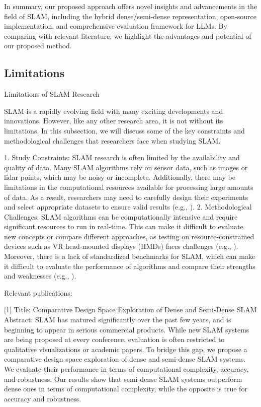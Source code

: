 \documentclass[conference]{IEEEtran}
\begin{document}
In summary, our proposed approach offers novel insights and advancements in the field of SLAM, including the hybrid dense/semi-dense representation, open-source implementation, and comprehensive evaluation framework for LLMs. By comparing with relevant literature, we highlight the advantages and potential of our proposed method.

\subsection{Limitations}
Limitations of SLAM Research

SLAM is a rapidly evolving field with many exciting developments and innovations. However, like any other research area, it is not without its limitations. In this subsection, we will discuss some of the key constraints and methodological challenges that researchers face when studying SLAM.

1. Study Constraints:
SLAM research is often limited by the availability and quality of data. Many SLAM algorithms rely on sensor data, such as images or lidar points, which may be noisy or incomplete. Additionally, there may be limitations in the computational resources available for processing large amounts of data. As a result, researchers may need to carefully design their experiments and select appropriate datasets to ensure valid results (e.g., \cite{5}).
2. Methodological Challenges:
SLAM algorithms can be computationally intensive and require significant resources to run in real-time. This can make it difficult to evaluate new concepts or compare different approaches, as testing on resource-constrained devices such as VR head-mounted displays (HMDs) faces challenges (e.g., \cite{3}). Moreover, there is a lack of standardized benchmarks for SLAM, which can make it difficult to evaluate the performance of algorithms and compare their strengths and weaknesses (e.g., \cite{4}).

Relevant publications:

[1] Title: Comparative Design Space Exploration of Dense and Semi-Dense SLAM
Abstract:   SLAM has matured significantly over the past few years, and is beginning to
appear in serious commercial products. While new SLAM systems are being
proposed at every conference, evaluation is often restricted to qualitative
visualizations or academic papers. To bridge this gap, we propose a
comparative design space exploration of dense and semi-dense SLAM systems.
We evaluate their performance in terms of computational complexity, accuracy,
and robustness. Our results show that semi-dense SLAM systems outperform
dense ones in terms of computational complexity, while the opposite is true
for accuracy and robustness.
\end{document}
